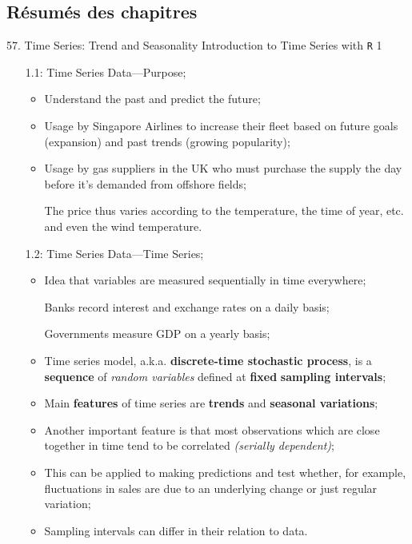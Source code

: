 \subsection{Résumés des chapitres}

\begin{CHPT_SUMM_AUTO}[label = {L.-57}]{57. Time Series: Trend and Seasonality}
Introduction to Time Series with \texttt{R} 1
\begin{itemize}
	\item[1.1:]	Time Series Data---Purpose;
		\begin{itemize}
		\item	Understand the past and predict the future;
		\item	Usage by Singapore Airlines to increase their fleet based on future goals (expansion) and past trends (growing popularity);
		\item	Usage by gas suppliers in the UK who must purchase the supply the day before it's demanded from offshore fields;
		\item[]	The price thus varies according to the temperature, the time of year, etc. and even the wind temperature.
		\end{itemize}
	\item[1.2:]	Time Series Data---Time Series;
		\begin{itemize}
		\item	Idea that variables are measured sequentially in time everywhere;
		\item[]	Banks record interest and exchange rates on a daily basis;
		\item[]	Governments measure GDP on a yearly basis;
		\item	Time series model, a.k.a. \textbf{discrete-time stochastic process}, is a \textbf{sequence} of \textit{random variables} defined at \textbf{fixed} \textbf{sampling intervals};
		\item	Main \textbf{features} of time series are \textbf{trends} and \textbf{seasonal variations};
		\item	Another important feature is that most observations which are close together in time tend to be correlated \textit{(serially dependent)};
		\item	This can be applied to making predictions and test whether, for example, fluctuations in sales are due to an underlying change or just regular variation;
		\item	Sampling intervals can differ in their relation to data.
			\begin{itemize}

\end{itemize}
\end{itemize}
\end{itemize}
\end{CHPT_SUMM_AUTO}
